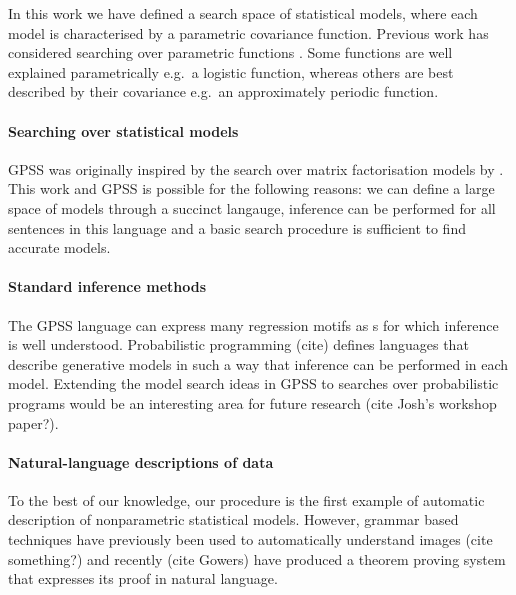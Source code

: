 \documentclass{article}
\def\eg{e.g.\ }
\begin{document}
In this work we have defined a search space of statistical models, where each model is characterised by a parametric covariance function.
Previous work has considered searching over parametric functions \citep[e.g.][]{Schmidt2009b}.
Some functions are well explained parametrically \eg a logistic function, whereas others are best described by their covariance \eg an approximately periodic function.

\paragraph{Searching over statistical models}

GPSS was originally inspired by the search over matrix factorisation models by \cite{grosse2012exploiting}.
This work and GPSS is possible for the following reasons: we can define a large space of models through a succinct langauge, inference can be performed for all sentences in this language and a basic search procedure is sufficient to find accurate models.

\paragraph{Standard inference methods}
The GPSS language can express many regression motifs as \gp{}s for which inference is well understood.
Probabilistic programming (cite) defines languages that describe generative models in such a way that inference can be performed in each model.
Extending the model search ideas in GPSS to searches over probabilistic programs would be an interesting area for future research (cite Josh's workshop paper?).

\paragraph{Natural-language descriptions of data}

To the best of our knowledge, our procedure is the first example of automatic description of nonparametric statistical models.%
However, grammar based techniques have previously been used to automatically understand images (cite something?) and recently (cite Gowers) have produced a theorem proving system that expresses its proof in natural language.
\end{document}
